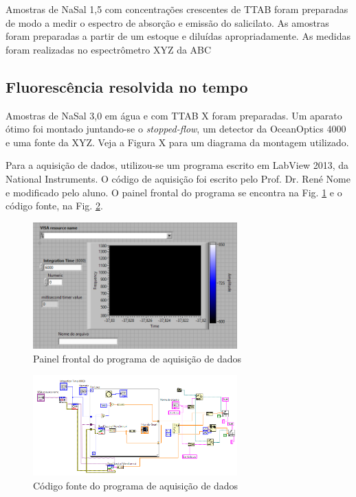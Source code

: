 			Amostras de NaSal 1,5\mM{} com concentrações crescentes de TTAB foram preparadas de modo a medir o espectro de absorção e emissão do salicilato. As amostras foram preparadas a partir de um estoque e diluídas apropriadamente. As medidas foram realizadas no espectrômetro XYZ da ABC %
			
			\subsection{Fluorescência resolvida no tempo}
			
			Amostras de NaSal 3,0\mM{} em água e com TTAB X\mM{} foram preparadas. Um aparato ótimo foi montado juntando-se o \emph{stopped-flow}, um detector da OceanOptics 4000 e uma fonte da XYZ. Veja a Figura X para um diagrama da montagem utilizado.
			
			
			Para a aquisição de dados, utilizou-se um programa escrito em LabView 2013, da National Instruments. O código de aquisição foi escrito pelo Prof. Dr. René Nome e modificado pelo aluno. O painel frontal do programa se encontra na Fig. \ref{fig:fluor_painelfrontal} e o código fonte, na Fig. \ref{fig:fluor_gravacaodados}.
			
			\begin{figure}[H]
				\centering
				\includegraphics[width=0.7\textwidth]{imagens/fluor/painel_frontal}
				\caption{Painel frontal do programa de aquisição de dados}
				\label{fig:fluor_painelfrontal}
			\end{figure}
			
			\begin{figure}[H]
				\centering
				\includegraphics[width=0.7\textwidth]{imagens/fluor/gravacao_dados}
				\caption{Código fonte do programa de aquisição de dados}
				\label{fig:fluor_gravacaodados}
			\end{figure}

